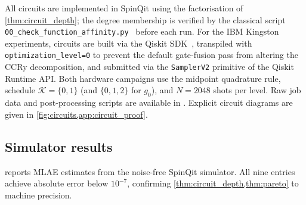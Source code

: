 \documentclass[12pt,a4paper]{article}
\theoremstyle{plain}
\theoremstyle{definition}
\theoremstyle{remark}
\begin{document}
All circuits are implemented in SpinQit \cite{SpinQit2022} using the
factorisation of \cref{thm:circuit_depth}; the degree membership is
verified by the classical script
\texttt{00\_check\_function\_affinity.py}~\cite{spinqit_repo}
before each run.
For the IBM Kingston experiments, circuits are built via the Qiskit
SDK~\cite{IBMQuantum2024}, transpiled with \texttt{optimization\_level=0}
to prevent the default gate-fusion pass from altering the CCRy
decomposition, and submitted via the \texttt{SamplerV2} primitive
of the Qiskit Runtime API.
Both hardware campaigns use the midpoint quadrature rule,
schedule $\mathcal{K}=\{0,1\}$ (and $\{0,1,2\}$ for $g_0$),
and $N=2048$ shots per level.
Raw job data and post-processing scripts are available in
\cite{spinqit_repo}.
Explicit circuit diagrams are given in \cref{fig:circuits,app:circuit_proof}.

\subsection{Simulator results}
\label{subsec:sim_validation}

 reports MLAE estimates from the noise-free
SpinQit simulator.
All nine entries achieve absolute error below $10^{-7}$, confirming
\cref{thm:circuit_depth,thm:pareto} to machine precision.
\end{document}
